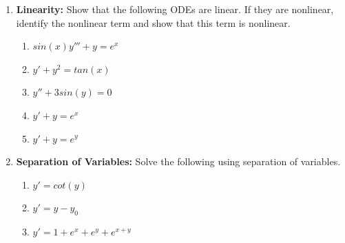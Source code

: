 \documentclass[letterpaper, fontsize=11pt]{scrartcl} %
\numberwithin{equation}{section} %
\numberwithin{figure}{section} %
\numberwithin{table}{section} %
\begin{document}
\begin{enumerate}
\item \textbf{Linearity:} Show that the following ODEs are linear. If they are nonlinear, identify the nonlinear term and show that this term is nonlinear.

\begin{enumerate}
\item $sin(x)y''' + y = e^x$
\item $y' + y^2 = tan(x)$
\item $y'' + 3sin(y) = 0$
\item $y' + y = e^x$ 
\item $y' + y = e^y$
\end{enumerate}

\item \textbf{Separation of Variables:} Solve the following using separation of variables. 
\begin{enumerate}
\item $y' = cot(y)$ 

\item $y' = y - y_0$


\item $y' = 1 + e^{x} + e^{y} + e^{x + y}$ 

\end{enumerate}


\end{enumerate}
\end{document}
